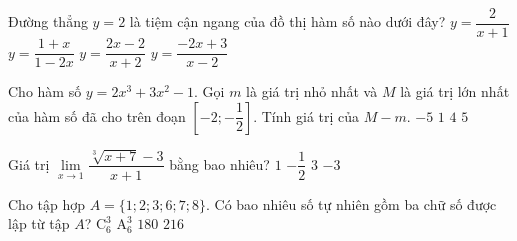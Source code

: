 \begin{ex}%
	Đường thẳng $y=2$ là tiệm cận ngang của đồ thị hàm số nào dưới đây?
	\choice
	{$ y=\dfrac{2}{x+1} $}
	{$ y=\dfrac{1+x}{1-2x} $}
	{\True $ y=\dfrac{2x-2}{x+2} $}
	{$ y=\dfrac{-2x+3}{x-2} $}
\end{ex}
\begin{ex}%
Cho hàm số $y=2x^3+3x^2-1$.	Gọi $m$ là giá trị nhỏ nhất và $M$ là giá trị lớn nhất của hàm số đã cho trên đoạn $ \left[ -2;-\dfrac{1}{2}\right] $. Tính giá trị của $M-m$.
	\choice
	{$ -5 $}
	{$ 1 $}
	{$ 4 $}
	{\True $ 5 $}
\end{ex}
\begin{ex}%
	Giá trị $ \lim\limits_{x\to 1} \dfrac{\sqrt[3]{x+7}-3}{x+1}$ bằng bao nhiêu?
	\choice
	{$ 1 $}
	{\True $ -\dfrac{1}{2} $}
	{$ 3 $}
	{$ -3 $}
\end{ex}
\begin{ex}%
	Cho tập hợp $A=\{1;2;3;6;7;8\}$. Có bao nhiêu số tự nhiên gồm ba chữ số được lập từ tập $A$?
	\choice
	{$ \mathrm{C}_6^3 $}
	{ $ \mathrm{A}_6^3 $}
	{$ 180 $}
	{\True $ 216 $}
\end{ex}

